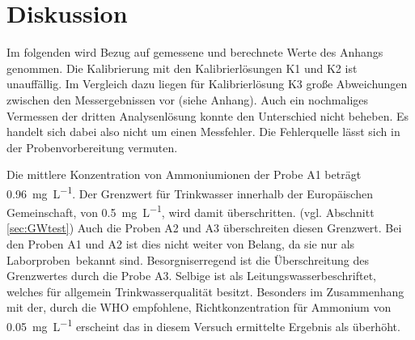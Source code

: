 \newpage
\section{Diskussion}
\label{sec:diskussion}
Im folgenden wird Bezug auf gemessene und berechnete Werte des Anhangs genommen.
Die Kalibrierung mit den Kalibrierlösungen K1 und K2 ist unauffällig. Im Vergleich dazu liegen für Kalibrierlösung K3 große Abweichungen zwischen den Messergebnissen vor (siehe Anhang). Auch ein nochmaliges Vermessen der dritten Analysenlösung konnte den Unterschied nicht beheben. Es handelt sich dabei also nicht um einen Messfehler. Die Fehlerquelle lässt sich in der Probenvorbereitung vermuten.

Die mittlere Konzentration von Ammoniumionen der Probe A1 beträgt \SI{0,96}{\milli\gram\per\liter}. Der Grenzwert für Trinkwasser innerhalb der Europäischen Gemeinschaft, von \SI{0,5}{\milli\gram\per\liter}, wird damit überschritten. (vgl. Abschnitt \ref{sec:GWtest}) Auch die Proben A2 und A3 überschreiten diesen Grenzwert. Bei den Proben A1 und A2 ist dies nicht weiter von Belang, da sie nur als \glqq Laborproben\grqq\, bekannt sind. Besorgniserregend ist die Überschreitung des Grenzwertes durch die Probe A3. Selbige ist als \glqq Leitungswasser\grqq beschriftet, welches für allgemein Trinkwasserqualität besitzt. Besonders im Zusammenhang mit der, durch die WHO empfohlene, Richtkonzentration für Ammonium von \SI{0,05}{\milli\gram\per\liter} erscheint das in diesem Versuch ermittelte Ergebnis als überhöht. 



